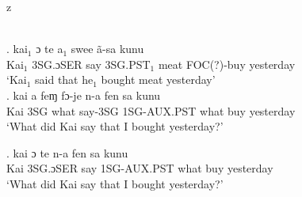 z   \documentclass{assets/fieldnotes}
\begin{document}
\\

\exg. kai$_{1}$ ɔ te a$_{1}$ swee ã-sa kunu\\
Kai$_{1}$ 3SG.ɔSER say 3SG.PST$_{1}$ meat FOC(?)-buy yesterday\\
`Kai$_{1}$ said that he$_{1}$ bought meat yesterday' \\ 


\exg. kai a feɱ fɔ-je n-a fen sa kunu\\
Kai 3SG what say-3SG 1SG-AUX.PST  what buy yesterday\\
`What did Kai say that I bought yesterday?' \\


\exg. kai ɔ te n-a fen sa kunu\\
Kai 3SG.ɔSER  say 1SG-AUX.PST  what buy yesterday\\
`What did Kai say that I bought yesterday?' \\
\end{document}

